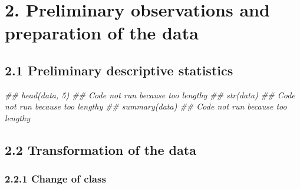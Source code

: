\documentclass[
  letterpaper,
  DIV=11,
  numbers=noendperiod]{scrreprt}
\newenvironment{Shaded}{\begin{snugshade}}{\end{snugshade}}
\newcommand{\DocumentationTok}[1]{\textcolor[rgb]{0.37,0.37,0.37}{\textit{#1}}}
\newcommand{\FunctionTok}[1]{\textcolor[rgb]{0.28,0.35,0.67}{#1}}
\newcommand{\NormalTok}[1]{\textcolor[rgb]{0.00,0.23,0.31}{#1}}
\newcommand{\OtherTok}[1]{\textcolor[rgb]{0.00,0.23,0.31}{#1}}
\newcommand{\SpecialCharTok}[1]{\textcolor[rgb]{0.37,0.37,0.37}{#1}}
\begin{document}
\hypertarget{preliminary-observations-and-preparation-of-the-data}{%
\chapter{2. Preliminary observations and preparation of the
data}\label{preliminary-observations-and-preparation-of-the-data}}

\hypertarget{preliminary-descriptive-statistics}{%
\section{2.1 Preliminary descriptive
statistics}\label{preliminary-descriptive-statistics}}

\begin{Shaded}
\begin{Highlighting}[]
\DocumentationTok{\#\# head(data, 5) \#\# Code not run because too lengthy}
\DocumentationTok{\#\# str(data) \#\# Code not run because too lengthy}
\DocumentationTok{\#\# summary(data) \#\# Code not run because too lengthy}
\end{Highlighting}
\end{Shaded}

\hypertarget{transformation-of-the-data}{%
\section{2.2 Transformation of the
data}\label{transformation-of-the-data}}

\hypertarget{change-of-class}{%
\subsection{2.2.1 Change of class}\label{change-of-class}}

\begin{Shaded}
\end{Shaded}
\end{document}
